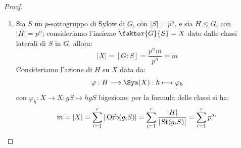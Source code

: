\documentclass[11pt]{scrartcl}
\begin{document}
\begin{proof}
\begin{enumerate}[(1)]
                \[ p^{n - \alpha} \pdiv |\mathcal{M}|
                    \] 
                ovvero $p^{n - \alpha}$ è l'esatta potenza di $p$ che divide $|\mathcal{M}|$.
                Consideriamo $M \in \mathcal{M}$, allora $gM \in \mathcal{M}$ (non varia la cardinalità di $M$), $\forall g \in G$, dunque possiamo considerare l'azione:
                \[ \phi : G \longrightarrow S(\mathcal{M}) : g \longmapsto \varphi_g
                    \]
                dove $\varphi_g : \mathcal{M} \longrightarrow \mathcal{M} : M \longmapsto gM$ è una bigezione. Data l'azione $\phi$ sappiamo che:
                \[ \mathcal{M} = \bigcupdot_{i = 1}^{s}\Orb(M_i) \implies |\mathcal{M}| = \sum_{i = 1}^{s} |\Orb(M_i)| = \sum_{i = 1}^s \frac{|G|}{|\St(M_i)|}
                    \]
                unendo ciò a quanto detto si ha che $p^{n - \alpha} \pdiv \sum_{i = 1}^s \frac{|G|}{|\St(M_i)|}$, quindi non tutte le orbite possono essere divisibili per una potenza maggiore di $p^{n - \alpha}$, ovvero esiste almeno un $i$
                tale per cui $p^{n - \alpha + 1} \nmid |\Orb(M_i)|$(cioè non può essere diviso per una potenza più grande di quanto detto), da ciò segue: $\displaystyle p^{n - \alpha + 1} \nmid |\Orb(M_i)| = \frac{|G|}{|\St(M_i)|} = \frac{p^nm}{|\St(M_i)|}$,
                pertanto deve essere necessariamente che:
                \[ p^{\alpha} \mid |\St(M_i)| = t
                    \]
                cioè, affinché il rapporto non sia divisibile per $p^{n-\alpha+1}$, al denominatore deve esserci una potenza di $p$ maggiore o uguale ad $\alpha$. D'altra parte, sia $x \in M_i$, la funzione:
                \[ \varphi_x : \St(M_i) \longrightarrow M_i : y \longmapsto yx 
                    \]
                è iniettiva\footnote{Si vede che $\varphi_x(y) = \varphi_x(z) \iff yx = zx \iff y = z$.}, dunque $t = |\St(M_i)| \leq |M_i| = p^{\alpha}$, segue quindi $t = p^{\alpha}$, pertanto $\St(M_i)$ è il sottogruppo di ordine $p^{\alpha}$ cercato.
            \item Sia $S$ un $p$-sottogruppo di Sylow di $G$, con $|S| = p^n$, e sia $H \leqslant G$, con $|H| = p^{\alpha}$; consideriamo l'insieme $\faktor{G}{S} = X$ dato dalle classi laterali di $S$ in $G$, allora:
                \[ |X| = [G : S] = \frac{p^nm}{p^n} = m
                    \]
                Consideriamo l'azione di $H$ su $X$ data da:
                \[ \varphi: H \longrightarrow \Sym(X) : h \longmapsto \varphi_h
                    \]
                con $\varphi_h : X \longrightarrow X : gS \longmapsto hgS$ bigezione; per la formula delle classi si ha:
                \[ m = |X| = \sum_{i = 1}^{r}|\operatorname{Orb}(g_iS)| = \sum_{i = 1}^{r} \frac{|H|}{|\operatorname{St}(g_iS)|} = \sum_{i = 1}^{r} p^{a_i}
\]
\end{enumerate}
\end{proof}
\end{document}
